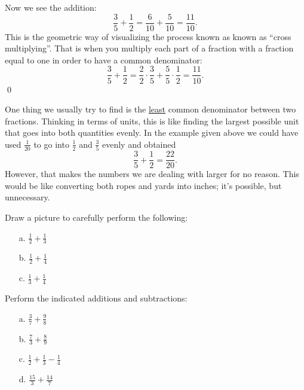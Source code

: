 \begin{eg}
\begin{figure}[h]
\label{fig:addfracs2}
\end{figure} 

Now we see the addition:
\[
\frac{3}{5} + \frac{1}{2} = \frac{6}{10}+\frac{5}{10} = \frac{11}{10}.
\]
This is the geometric way of visualizing the process known as  known as ``cross multiplying''. That is when you multiply each part of a fraction with a fraction equal to one in order to have a common denominator:
\[
\frac{3}{5}+\frac{1}{2} = \frac{2}{2}\cdot\frac{3}{5} + \frac{5}{5}\cdot\frac{1}{2} = \frac{11}{10}.
\]\qed
\end{eg}

\par

One thing we usually try to find is the \underline{least} common denominator between two fractions. Thinking in terms of units, this is like finding the largest possible unit that goes into both quantities evenly. In the example given above we could have used $\frac{1}{20}$ to go into $\frac{1}{2}$ and $\frac{3}{5}$ evenly and obtained
\[
\frac{3}{5}+\frac{1}{2} = \frac{22}{20}.
\]
However, that makes the numbers we are dealing with larger for no reason. This would be like converting both ropes and yards into inches; it's possible, but unnecessary.
  
\par     
 \begin{question}
 Draw  a picture to carefully perform the following:
 \begin{enumerate}
     \item[a.] $\frac12 + \frac13$
     \item[b.] $\frac12+\frac14$
     \item[c.]  $\frac13+\frac14$
 \end{enumerate}
 \end{question}
\begin{question} Perform the indicated additions and subtractions:
\begin{enumerate}
\item[a.] $\frac{3}{7}+\frac{9}{8}$
\item[b.] $\frac{7}{3}+\frac{8}{9}$
\item[c.] $\frac{1}{2} + \frac{1}{3} - \frac{1}{4}$
\item[d.] $\frac{15}{3}  + \frac{14}{7}$
\end{enumerate}
\end{question}

